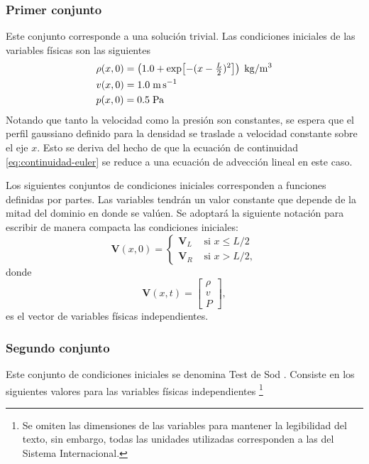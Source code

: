 \subsubsection{Primer conjunto}
\label{sec:gaussiana41}
Este conjunto corresponde a una solución trivial. Las condiciones iniciales de las variables físicas son las siguientes
\begin{align}
	&\rho(x,0) =  \left(1.0+\exp[-(x-\tfrac{L}{2})^{2}]\right)\hspace{1mm}\unit{\kilogram\per\meter^{3}} \\
	&v(x,0) = 1.0 \hspace{1mm}\unit{\meter\per\second} \\
	&p(x,0) = 0.5 \hspace{1mm}\unit{\pascal}
\end{align}
Notando que tanto la velocidad como la presión son constantes, se espera que el perfil gaussiano definido para la densidad se traslade a velocidad constante sobre el eje $x$. Esto se deriva del hecho de que la ecuación de continuidad \eqref{eq:continuidad-euler} se reduce a una ecuación de advección lineal en este caso.

Los siguientes conjuntos de condiciones iniciales corresponden a funciones definidas por partes. Las variables tendrán un valor constante que depende de la mitad del dominio en donde se valúen. Se adoptará la siguiente notación para escribir de manera compacta las condiciones iniciales:
\begin{equation}
	\mathbf{V}(x,0) = 
	\begin{cases}
		\mathbf{V}_{L} & \text{ si } x \leq L/2\\
		\mathbf{V}_{R} & \text{ si } x > L/2,
	\end{cases}
\end{equation}
donde
\begin{equation}
\mathbf{V}(x,t) = 
	\begin{bmatrix}
		\rho \\
		v \\
		P
	\end{bmatrix},
\end{equation}
es el vector de variables físicas independientes.

\subsubsection{Segundo conjunto}
\label{sec:sod_con_entropy148}
Este conjunto de condiciones iniciales se denomina Test de Sod \cite{thesis-euler-godunov}. Consiste en los siguientes valores para las variables físicas independientes \footnote{Se omiten las dimensiones de las variables para mantener la legibilidad del texto, sin embargo, todas las unidades utilizadas corresponden a las del Sistema Internacional.}

